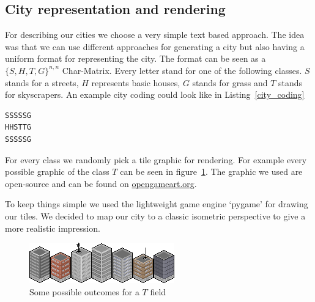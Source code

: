 \documentclass{scrartcl}
\begin{document}
\subsection{City representation and rendering}

For describing our cities we choose a very simple text based approach. The
idea was that we can use different approaches for generating a city but
also having a uniform format for representing the city.
The format can be seen as a $\lbrace S,H,T,G \rbrace^{n,n}$ Char-Matrix.
Every letter stand for one of the following classes.
$S$ stands for a streets, $H$ represents basic houses, $G$ stands for grass
and $T$ stands for skyscrapers.
An example city coding could look like in Listing~\ref{city_coding}
\begin{lstlisting}[float,frame=lines,caption=Example city coding, label=city_coding]
SSSSSG
HHSTTG
SSSSSG
\end{lstlisting}

For every class we randomly pick a tile graphic for rendering. For example every possible
graphic of the class $T$ can be seen in figure~\ref{fig:tower_tiles}.
The graphic we used are open-source and can be found on
\href{https://opengameart.org}{opengameart.org}.

To keep things simple we used the lightweight game engine `pygame' for drawing
our tiles. We decided to map our city to a classic isometric perspective to
give a more realistic impression.

\begin{figure}
    \centering
    \includegraphics[scale = 4]{tower_tiles}
    \caption{Some possible outcomes for a $T$ field}
    \label{fig:tower_tiles}
\end{figure}
\end{document}
